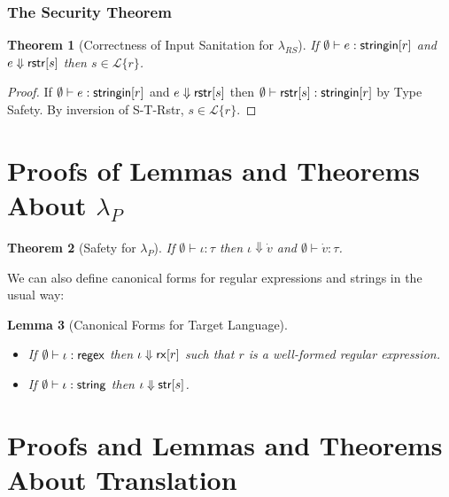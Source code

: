 \documentclass[12pt]{article}
\newtheorem{thm}{Theorem}
\newtheorem{lem}[thm]{Lemma}
\theoremstyle{definition}
\newcommand{\Lagr}{\mathcal{L}}
\newcommand{\lang}[1]{\Lagr\{#1\}}
\newcommand{\lambdas}{\lambda_{RS}}
\newcommand{\lambdap}{\lambda_P}
\newcommand{\stringin}[1]{{\sf stringin}[#1]}
\renewcommand{\tstr}[1]{{{\sf str}[#1]}}
\newcommand{\rx}[1]{ {\sf rx}[#1] }
\newcommand{\str}{{\sf string}}
\newcommand{\regex}{{\sf regex}}
\newcommand{\treduces}{ \Downarrow }
\newcommand{\sreduces}{ \Downarrow }
\begin{document}
\subsubsection{The Security Theorem}\label{sec:securitythm}

\begin{thm}[Correctness of Input Sanitation for $\lambdas$]\label{thm:scorrect}
  If  $\emptyset \vdash e : \stringin{r}$ and $e \sreduces \rstr{s}$ then $s \in \lang{r}$.
\end{thm}
\begin{proof}
If $\emptyset \vdash e : \stringin{r}$ and $e \sreduces \rstr{s}$ then $\emptyset \vdash \rstr{s} : \stringin{r}$ by Type Safety.
By inversion of S-T-Rstr, $s \in \lang{r}$.
\end{proof}



\section{Proofs of Lemmas and Theorems About $\lambdap$}


\begin{thm}[Safety for $\lambdap$] If $\emptyset \vdash \iota : \tau$ 
  then $\iota \sreduces \dot v$ and $\emptyset \vdash \dot v : \tau$.
\end{thm}

We can also define canonical forms for regular expressions and strings in the usual way:


\begin{lem}[Canonical Forms for Target Language]
~
\begin{itemize}
\item 
If $\emptyset \vdash \iota : \regex$ then $\iota \treduces \rx{r}$ such that $r$ is a well-formed regular expression. 
\item 
If $\emptyset \vdash \iota : \str$ then $\iota \treduces \tstr{s}$.
\end{itemize}
\end{lem}


\section{Proofs and Lemmas and Theorems About Translation}
\end{document}
